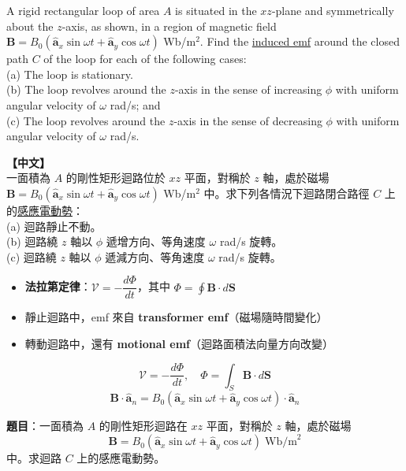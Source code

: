\documentclass[12pt,a4paper]{article}
\newcommand{\vB}{\mathbf{B}}
\newcommand{\vS}{\mathbf{S}}
\newcommand{\ax}{\hat{\mathbf{a}}_x}
\newcommand{\ay}{\hat{\mathbf{a}}_y}
\newcommand{\an}{\hat{\mathbf{a}}_n}
\newcommand{\emf}{\mathcal{V}}
\begin{document}
\begin{questionbox}
A rigid rectangular loop of area $A$ is situated in the $xz$-plane and symmetrically about the $z$-axis, as shown, in a region of magnetic field $\vB = B_0(\ax \sin\omega t + \ay \cos\omega t)$ Wb/m$^2$. Find the \underline{induced emf} around the closed path $C$ of the loop for each of the following cases:\\
(a) The loop is stationary.\\
(b) The loop revolves around the $z$-axis in the sense of increasing $\phi$ with uniform angular velocity of $\omega$ rad/s; and\\
(c) The loop revolves around the $z$-axis in the sense of decreasing $\phi$ with uniform angular velocity of $\omega$ rad/s.

\medskip\noindent\textbf{【中文】}\\
一面積為 $A$ 的剛性矩形迴路位於 $xz$ 平面，對稱於 $z$ 軸，處於磁場 $\vB = B_0(\ax \sin\omega t + \ay \cos\omega t)$ Wb/m$^2$ 中。求下列各情況下迴路閉合路徑 $C$ 上的\underline{感應電動勢}：\\
(a) 迴路靜止不動。\\
(b) 迴路繞 $z$ 軸以 $\phi$ 遞增方向、等角速度 $\omega$ rad/s 旋轉。\\
(c) 迴路繞 $z$ 軸以 $\phi$ 遞減方向、等角速度 $\omega$ rad/s 旋轉。
\end{questionbox}

\begin{conceptbox}[核心概念]
\begin{itemize}
  \item \textbf{法拉第定律}：$\emf = -\dfrac{d\Phi}{dt}$，其中 $\Phi = \displaystyle\oint \vB \cdot d\vS$
  \item 靜止迴路中，emf 來自 \textbf{transformer emf}（磁場隨時間變化）
  \item 轉動迴路中，還有 \textbf{motional emf}（迴路面積法向量方向改變）
\end{itemize}
\end{conceptbox}

\begin{formulabox}[相關公式]
\[
  \emf = -\frac{d\Phi}{dt}, \quad \Phi = \int_S \vB \cdot d\vS
\]
\[
  \vB \cdot \an = B_0 (\ax \sin\omega t + \ay \cos\omega t) \cdot \an
\]
\end{formulabox}

\textbf{題目}：一面積為 $A$ 的剛性矩形迴路在 $xz$ 平面，對稱於 $z$ 軸，處於磁場
\[
  \vB = B_0(\ax \sin\omega t + \ay \cos\omega t) \;\text{Wb/m}^2
\]
中。求迴路 $C$ 上的感應電動勢。
\end{document}
